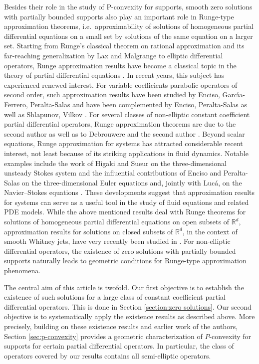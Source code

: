 \documentclass[a4paper,10pt]{amsart}
\newtheorem*{crucial lemma}{Lemma \ref{lem:nice polynomial2}}
\theoremstyle{definition}
\newcommand{\R}{\mathbb{R}}
\begin{document}
Besides their role in the study of P-convexity for supports, smooth zero solutions with partially bounded supports also play an important role in Runge-type approximation theorems, i.e.~approximability of solutions of homogeneous partial differential equations on a small set by solutions of the same equation on a larger set. Starting from Runge's classical theorem on rational approximation and its far-reaching generalization by Lax and Malgrange to elliptic differential operators, Runge approximation results have become a classical topic in the theory of partial differential equations \cite{Browder1962b,Browder1962}. In recent years, this subject has experienced renewed interest. For variable coefficients parabolic operators of second order, such approximation results have been studied by Enciso, Garc\'{\i}a-Ferrero, Peralta-Salas \cite{EnGaPe19} and have been complemented by Enciso, Peralta-Salas \cite{EnPe21} as well as Shlapunov, Vilkov \cite{ShVi24}. For several classes of non-elliptic constant coefficient partial differential operators, Runge approximation theorems are due to the second author \cite{Kalmes2021} as well as to Debrouwere and the second author \cite{DebKalmes2024}. Beyond scalar equations, Runge approximation for systems has attracted considerable recent interest, not least because of its striking applications in fluid dynamics. Notable examples include the work of Higaki and Sueur on the three-dimensional unsteady Stokes system \cite{HiSu25} and the influential contributions of Enciso and Peralta-Salas on the three-dimensional Euler equations \cite{EnPe12,EnPe15} and, jointly with Lucá, on the Navier--Stokes equations \cite{EnLuPe17}. These developments suggest that approximation results for systems can serve as a useful tool in the study of fluid equations and related PDE models. While the above mentioned results deal with Runge theorems for solutions of homogeneous partial differential equations on open subsets of $\R^d$, approximation results for solutions on closed subsets of $\R^d$, in the context of smooth Whitney jets, have very recently been studied in \cite{CiasKalmes2025}. For non-elliptic differential operators, the existence of zero solutions with partially bounded supports naturally leads to geometric conditions for Runge-type approximation phenomena.

The central aim of this article is twofold. Our first objective is to establish the existence of such solutions for a large class of constant coefficient partial differential operators. This is done in Section \ref{section:zero solutions}. Our second objective is to systematically apply the existence results as described above. More precisely, building on these existence results and earlier work of the authors, Section \ref{sec:p-convexity} provides a geometric characterization of $P$-convexity for supports for certain partial differential operators. In particular, the class of operators covered by our results contains all semi-elliptic operators.
\end{document}
